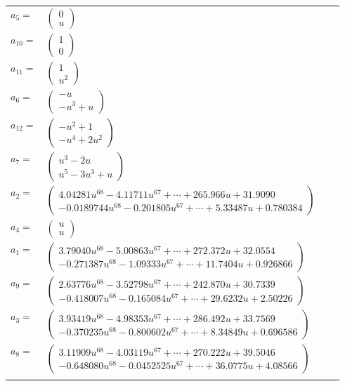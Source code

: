 \documentclass[1p]{elsarticle_modified}
\theoremstyle{definition}
\begin{document}
\begin{tabular}{m{7pt} m{180pt} m{7pt} m{180pt} }
\flushright $a_{5}=$&$\begin{pmatrix}0\\u\end{pmatrix}$ \\
\flushright $a_{10}=$&$\begin{pmatrix}1\\0\end{pmatrix}$ \\
\flushright $a_{11}=$&$\begin{pmatrix}1\\u^2\end{pmatrix}$ \\
\flushright $a_{6}=$&$\begin{pmatrix}- u\\- u^3+u\end{pmatrix}$ \\
\flushright $a_{12}=$&$\begin{pmatrix}- u^2+1\\- u^4+2 u^2\end{pmatrix}$ \\
\flushright $a_{7}=$&$\begin{pmatrix}u^3-2 u\\u^5-3 u^3+u\end{pmatrix}$ \\
\flushright $a_{2}=$&$\begin{pmatrix}4.04281 u^{68}-4.11711 u^{67}+\cdots+265.966 u+31.9090\\-0.0189744 u^{68}-0.201805 u^{67}+\cdots+5.33487 u+0.780384\end{pmatrix}$ \\
\flushright $a_{4}=$&$\begin{pmatrix}u\\u\end{pmatrix}$ \\
\flushright $a_{1}=$&$\begin{pmatrix}3.79040 u^{68}-5.00863 u^{67}+\cdots+272.372 u+32.0554\\-0.271387 u^{68}-1.09333 u^{67}+\cdots+11.7404 u+0.926866\end{pmatrix}$ \\
\flushright $a_{9}=$&$\begin{pmatrix}2.63776 u^{68}-3.52798 u^{67}+\cdots+242.870 u+30.7339\\-0.418007 u^{68}-0.165084 u^{67}+\cdots+29.6232 u+2.50226\end{pmatrix}$ \\
\flushright $a_{3}=$&$\begin{pmatrix}3.93419 u^{68}-4.98353 u^{67}+\cdots+286.492 u+33.7569\\-0.370235 u^{68}-0.800602 u^{67}+\cdots+8.34849 u+0.696586\end{pmatrix}$ \\
\flushright $a_{8}=$&$\begin{pmatrix}3.11909 u^{68}-4.03119 u^{67}+\cdots+270.222 u+39.5046\\-0.648080 u^{68}-0.0452525 u^{67}+\cdots+36.0775 u+4.08566\end{pmatrix}$\\&\end{tabular}
\end{document}
